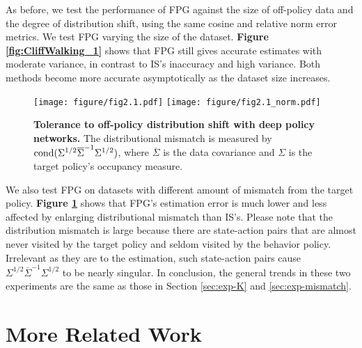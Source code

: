 \documentclass{article}
\numberwithin{equation}{section}
\begin{document}
As before, we test the performance of FPG against the size of off-policy data and the degree of distribution shift, using the same cosine and relative norm error metrics. We test FPG varying the size of the dataset. \textbf{Figure \ref{fig:CliffWalking_1}} shows that FPG still gives accurate estimates with moderate variance, in contrast to IS's inaccuracy and high variance. Both methods become more accurate asymptotically as the dataset size increases.

\begin{figure}[!t]
 \centering
  \texttt{[image: figure/fig2.1.pdf]}
  \texttt{[image: figure/fig2.1\_norm.pdf]}
\caption{\textbf{Tolerance to off-policy distribution shift with deep policy networks.} The distributional mismatch is measured by  $\hbox{cond}(\Sigma^{1/2}\overline{\Sigma}^{-1}\Sigma^{1/2})$, where $\overline{\Sigma}$ is the data covariance and $\Sigma$ is the target policy's occupancy measure.}
\label{fig:CliffWalking_2}
\end{figure}

We also test FPG on datasets with different amount of mismatch from the target policy. \textbf{Figure \ref{fig:CliffWalking_2}} shows that FPG's estimation error is much lower and less affected by enlarging distributional mismatch than IS's. Please note that the distribution mismatch is large because there are state-action pairs that are almost never visited by the target policy and seldom visited by the behavior policy. Irrelevant as they are to the estimation, such state-action pairs cause $\Sigma^{1/2}\overline{\Sigma}^{-1}\Sigma^{1/2}$ to be nearly singular. In conclusion, the general trends in these two experiments are the same as those in Section \ref{sec:exp-K} and \ref{sec:exp-mismatch}.

\section{More Related Work}
\end{document}
